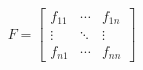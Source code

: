 

\begin{equation}
F = \begin{bmatrix}
f_{11} & \cdots & f_{1n} \\
\vdots & \ddots & \vdots \\
f_{n1} & \cdots & f_{nn}
\end{bmatrix}
\end{equation}

